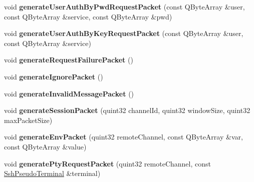 \begin{DoxyCompactItemize}
void {\bfseries generate\+User\+Auth\+By\+Pwd\+Request\+Packet} (const Q\+Byte\+Array \&user, const Q\+Byte\+Array \&service, const Q\+Byte\+Array \&pwd)
\item 
\mbox{\label{class_q_ssh_1_1_internal_1_1_ssh_outgoing_packet_ae1e8f2651a0af5fb913dd209f0f581ff}} 
void {\bfseries generate\+User\+Auth\+By\+Key\+Request\+Packet} (const Q\+Byte\+Array \&user, const Q\+Byte\+Array \&service)
\item 
\mbox{\label{class_q_ssh_1_1_internal_1_1_ssh_outgoing_packet_ac841e5dd63b3f8442b602936991af4f7}} 
void {\bfseries generate\+Request\+Failure\+Packet} ()
\item 
\mbox{\label{class_q_ssh_1_1_internal_1_1_ssh_outgoing_packet_a8bc80da7a3d2400e684c4f73f9cdb760}} 
void {\bfseries generate\+Ignore\+Packet} ()
\item 
\mbox{\label{class_q_ssh_1_1_internal_1_1_ssh_outgoing_packet_ad485a75a6969c9c99e2c42fa2a7da3ff}} 
void {\bfseries generate\+Invalid\+Message\+Packet} ()
\item 
\mbox{\label{class_q_ssh_1_1_internal_1_1_ssh_outgoing_packet_a66788afcf708c6e713c881a9e5a8ef39}} 
void {\bfseries generate\+Session\+Packet} (quint32 channel\+Id, quint32 window\+Size, quint32 max\+Packet\+Size)
\item 
\mbox{\label{class_q_ssh_1_1_internal_1_1_ssh_outgoing_packet_af6480bef347f306f8d56740dd406e771}} 
void {\bfseries generate\+Env\+Packet} (quint32 remote\+Channel, const Q\+Byte\+Array \&var, const Q\+Byte\+Array \&value)
\item 
\mbox{\label{class_q_ssh_1_1_internal_1_1_ssh_outgoing_packet_a6b03c96d62c2479b8716537eb2ab1029}} 
void {\bfseries generate\+Pty\+Request\+Packet} (quint32 remote\+Channel, const \mbox{\hyperlink{class_q_ssh_1_1_ssh_pseudo_terminal}{Ssh\+Pseudo\+Terminal}} \&terminal)
\item 
\mbox{\label{class_q_ssh_1_1_internal_1_1_ssh_outgoing_packet_ae291b01d1dd4c3de87f6e9f69c0c467b}} 

\end{DoxyCompactItemize}
